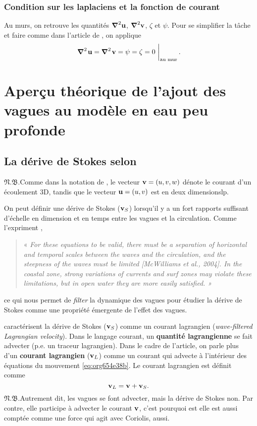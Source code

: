 \documentclass[10pt]{report}
\numberwithin{equation}{section}
\newcommand{\uu}{\vb{u}}
\newcommand{\vv}{\vb{v}}
\newcommand{\pt}{\hspace{1pt}} %
\newcommand{\nb}{\underline{{\footnotesize\EightStarConvex}\pt $\mathfrak{N.B.}$\vphantom{p}}\hspace{3pt}}
\begin{document}
\subsection{Condition sur les laplaciens et la fonction de courant}
\label{sec:orgc28b158}
Au murs, on retrouve les quantités \(\gradient^2{\uu}\), \(\gradient^2{\vv}\), \(\zeta\) et \(\psi\).
Pour se simplifier la tâche et faire comme dans l'article de \autocite{duhaut2006}, on applique
\begin{equation}
   \eval{\gradient^2\pt\uu = \gradient^2\pt\vv = \psi = \zeta =  0\ }_\text{au mur}.
\end{equation}


\chapter{Aperçu théorique de l'ajout des vagues au modèle en eau peu profonde}
\label{sec:orgb9821d0}

\section{La dérive de Stokes selon }
\label{sec:org9ccc590}

\nb Comme dans la notation de \textcite{vallis_2006}, le vecteur \(\vv = \qty(u,v,w)\) dénote le courant d'un écoulement 3D, tandis que le vecteur \(\uu = (u,v)\) est en deux dimensionslp.\bigskip

On peut définir une dérive de Stokes (\(\vv_S\)) lorsqu'il y a un fort rapports suffisant d'échelle en dimension et en temps entre les vagues et la circulation.
Comme l'expriment \textcite[voir][pour un résumé]{suzuki2016understanding},\smallskip
\begin{quote}
« \emph{For these equations to be valid, there must be a separation of horizontal and temporal scales between the waves and the circulation, and the steepness of the waves must be limited [McWilliams et al., 2004].
In the coastal zone, strong variations of currents and surf zones may violate these limitations, but in open water they are more easily satisﬁed. »}\bigskip
\end{quote}
ce qui nous permet de \emph{filter} la dynamique des vagues pour étudier la dérive de Stokes comme une propriété émergente de l'effet des vagues. \bigskip

\textcite{suzuki2016understanding}  caractérisent la dérive de Stokes (\(\vv_S\)) comme un courant lagrangien (\emph{wave-ﬁltered Lagrangian velocity}).
Dans le langage courant, un \textbf{quantité lagrangienne} se fait advecter (p.e. un traceur lagrangien).
Dans le cadre de l'article, on parle plus d'un \textbf{courant lagrangien} (\(\vv_L\)) comme un courant qui advecte à l'intérieur des équations du mouvement \ref{eq:org654e38b}.
Le courant lagrangien est définit comme
\begin{equation}
   \vv_L = \vv + \vv_S.
\end{equation}
\nb Autrement dit, les vagues se font advecter, mais la dérive de Stokes non.
Par contre, elle participe à advecter le courant \(\vv\), c'est pourquoi est elle est aussi comptée comme une force qui agit avec Coriolis, aussi.
\end{document}

